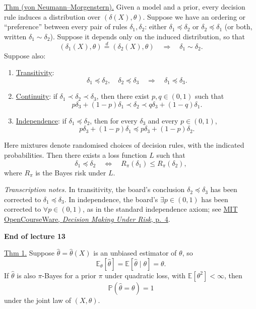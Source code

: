 \documentclass[11pt,a4paper]{article}
\begin{document}
\medskip
\noindent\underline{Thm (von Neumann--Morgenstern).}\quad
Given a model and a prior, every decision rule induces a distribution over
$(\delta(X),\theta)$. Suppose we have an ordering or ``preference'' between
every pair of rules $\delta_1,\delta_2$: either $\delta_1\preceq\delta_2$
or $\delta_2\preceq\delta_1$ (or both, written $\delta_1\sim\delta_2$).
Suppose it depends only on the induced distribution, so that
\[
(\delta_1(X),\theta)\overset d=(\delta_2(X),\theta)
\quad\Longrightarrow\quad\delta_1\sim\delta_2.
\]
Suppose also:
\begin{enumerate}
\item \underline{Transitivity}:
\[
\delta_1\preceq\delta_2,\quad\delta_2\preceq\delta_3
\quad\Longrightarrow\quad\delta_1\preceq\delta_3.
\]
\item \underline{Continuity}: if $\delta_1\prec\delta_2\prec\delta_3$,
then there exist $p,q\in(0,1)$ such that
\[
p\delta_3+(1-p)\delta_1\prec\delta_2
\prec q\delta_3+(1-q)\delta_1.
\]
\item \underline{Independence}: if $\delta_1\preceq\delta_2$, then for
every $\delta_3$ and every $p\in(0,1)$,
\[
p\delta_3+(1-p)\delta_1
\preceq p\delta_3+(1-p)\delta_2.
\]
\end{enumerate}
Here mixtures denote randomised choices of decision rules, with the
indicated probabilities.
Then there exists a loss function $L$ such that
\[
\delta_1\preceq\delta_2
\quad\Longleftrightarrow\quad
R_\pi(\delta_1)\leq R_\pi(\delta_2),
\]
where $R_\pi$ is the Bayes risk under $L$.

\medskip
\noindent\emph{Transcription notes.}
In transitivity, the board's conclusion $\delta_2\preceq\delta_3$ has been
corrected to $\delta_1\preceq\delta_3$.
In independence, the board's $\exists p\in(0,1)$ has been corrected to
$\forall p\in(0,1)$, as in the standard independence axiom; see
\href{https://ocw.mit.edu/courses/14-123-microeconomic-theory-iii-spring-2015/a8b0b0de1bebe039bc3cccc15f1b756f_MIT14_123S15_decision.pdf}
{MIT OpenCourseWare, \emph{Decision Making Under Risk}, p.~4}.

\begin{center}
\textbf{End of lecture 13}
\end{center}


\newpage
\noindent\underline{Thm 1.}\quad
Suppose $\hat\theta=\hat\theta(X)$ is an unbiased estimator of $\theta$, so
\[
\mathbb E_\theta[\hat\theta]=\mathbb E[\hat\theta\mid\theta]=\theta.
\]
If $\hat\theta$ is also $\pi$-Bayes for a prior $\pi$ under quadratic loss,
with $\mathbb E[\theta^2]<\infty$, then
\[
\mathbb P(\hat\theta=\theta)=1
\]
under the joint law of $(X,\theta)$.
\end{document}
